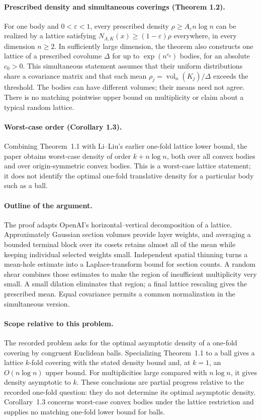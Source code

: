 \documentclass[11pt]{article}
\begin{document}
\paragraph{Prescribed density and simultaneous coverings (Theorem 1.2).}
For one body and $0<\varepsilon<1$, every prescribed density
$\rho\geq A_\varepsilon n\log n$ can be realized by a lattice satisfying
$N_{\Lambda,K}(x)\geq(1-\varepsilon)\rho$ everywhere, in every
dimension $n\geq2$. In sufficiently large dimension, the theorem also
constructs one lattice of a prescribed covolume $\Delta$ for up to
$\exp(n^{c_0})$ bodies, for an absolute $c_0>0$. This simultaneous
statement assumes that their uniform distributions share a covariance
matrix and that each mean
$\rho_j=\operatorname{vol}_n(K_j)/\Delta$ exceeds the threshold.
The bodies can have different volumes; their means need not agree.
There is no matching pointwise upper bound on multiplicity or
claim about a typical random lattice.

\paragraph{Worst-case order (Corollary 1.3).}
Combining Theorem~1.1 with Li--Liu's earlier one-fold lattice lower bound,
the paper obtains worst-case density of order $k+n\log n$, both over all
convex bodies and over origin-symmetric convex bodies. This is a
worst-case lattice statement; it does not identify the optimal
one-fold translative density for a particular body such as a ball.

\paragraph{Outline of the argument.}
The proof adapts OpenAI's horizontal--vertical decomposition of a lattice.
Approximately Gaussian section volumes provide layer weights, and
averaging a bounded terminal block over its cosets retains almost all of
the mean while keeping individual selected weights small. Independent
spatial thinning turns a mean-hole estimate into a Laplace-transform
bound for section counts. A random shear combines those estimates to
make the region of insufficient multiplicity very small. A small
dilation eliminates that region; a final lattice rescaling gives the
prescribed mean. Equal covariance permits a common normalization in the
simultaneous version.

\paragraph{Scope relative to this problem.}
The recorded problem asks for the optimal asymptotic density of a
one-fold covering by congruent Euclidean balls. Specializing
Theorem~1.1 to a ball gives a lattice $k$-fold covering with the stated
density bound and, at $k=1$, an $O(n\log n)$ upper bound.
For multiplicities large compared with $n\log n$, it gives density
asymptotic to $k$. These conclusions are partial progress relative to
the recorded one-fold question: they do not determine its optimal
asymptotic density. Corollary~1.3 concerns worst-case convex bodies
under the lattice restriction and supplies no matching one-fold lower
bound for balls.
\end{document}
